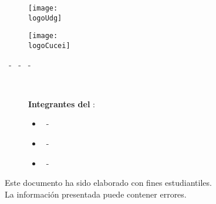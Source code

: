 



\begin{titlepage}
	\centering
	{\LARGE \textbf{\universidad}}\par
	\vspace{0.6cm}
	{\Large{\cede}}
	\vfill

	\begin{figure}[ht]
		\begin{minipage}[t]{0.45\textwidth}
			\centering
			\texttt{[image: \\logoUdg]}
		\end{minipage}
		\hfill
		\begin{minipage}[t]{0.45\textwidth}
			\centering
			\texttt{[image: \\logoCucei]}
		\end{minipage}
	\end{figure}
	\vfill

	\large{
		\division\vfill
		\textbf{\carrera}\vfill
		\textbf{\materia}\par\vspace{3pt}
		\seccion\ - \clave\ - \nrc\ - \generation \vfill
	}

	{\Large{\textbf{\theTitle \\}}}
	\vfill

	\begin{figure}[H]
		\centering
		\begin{minipage}[t]{0.75\textwidth}
			{\Large
				\begin{center}
					\textbf{Integrantes del \teamName}:\par\vspace{8pt}
				\end{center}
				\begin{itemize}
					\item \theAuthor\ - \theAuthorCode
					\item \bAuthor\ - \bAuthorCode
					\item \cAuthor\ - \cAuthorCode
				\end{itemize}
			}
		\end{minipage}
	\end{figure}
	\vfill

	\begin{tcolorbox}
		[colback=red!5!white, colframe=red!75!black]
		\centering
		\large{
			Este documento ha sido elaborado con fines estudiantiles.\\
			La información presentada puede contener errores.
		}
	\end{tcolorbox}
	\vfill
	{\large \startDate}
\end{titlepage}

